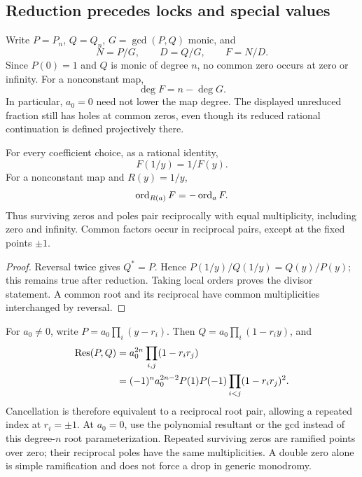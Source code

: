 \subsection{Reduction precedes locks and special values}
Write \(P=P_n\), \(Q=Q_n\), \(G=\gcd(P,Q)\) monic, and
\begin{equation}\label{eq:reduced}
 N=P/G,\qquad D=Q/G,\qquad F=N/D.
\end{equation}
Since \(P(0)=1\) and \(Q\) is monic of degree \(n\), no common zero occurs at zero or infinity. For a nonconstant map,
\begin{equation}\label{eq:degree}
 \deg F=n-\deg G.
\end{equation}
In particular, \(a_0=0\) need not lower the map degree. The displayed unreduced fraction still has holes at common zeros, even though its reduced rational continuation is defined projectively there.

\begin{proposition}\label{prop:reciprocal}
For every coefficient choice, as a rational identity,
\begin{equation}\label{eq:reciprocity}
 F(1/y)=1/F(y).
\end{equation}
For a nonconstant map and \(R(y)=1/y\),
\begin{equation}\label{eq:divisor}
 \operatorname{ord}_{R(a)}F=-\operatorname{ord}_aF.
\end{equation}
Thus surviving zeros and poles pair reciprocally with equal multiplicity, including zero and infinity. Common factors occur in reciprocal pairs, except at the fixed points \(\pm1\).
\end{proposition}
\begin{proof}
Reversal twice gives \(Q^*=P\). Hence \(P(1/y)/Q(1/y)=Q(y)/P(y)\); this remains true after reduction. Taking local orders proves the divisor statement. A common root and its reciprocal have common multiplicities interchanged by reversal.
\end{proof}

For \(a_0\ne0\), write \(P=a_0\prod_i(y-r_i)\). Then \(Q=a_0\prod_i(1-r_i y)\), and
\begin{align}\label{eq:resultant_general}
 \operatorname{Res}(P,Q)&=a_0^{2n}\prod_{i,j}(1-r_i r_j)\notag\\
 &=(-1)^na_0^{2n-2}P(1)P(-1)
       \prod_{i<j}(1-r_i r_j)^2.
\end{align}
Cancellation is therefore equivalent to a reciprocal root pair, allowing a repeated index at \(r_i=\pm1\). At \(a_0=0\), use the polynomial resultant or the gcd instead of this degree-\(n\) root parameterization. Repeated surviving zeros are ramified points over zero; their reciprocal poles have the same multiplicities. A double zero alone is simple ramification and does not force a drop in generic monodromy.

